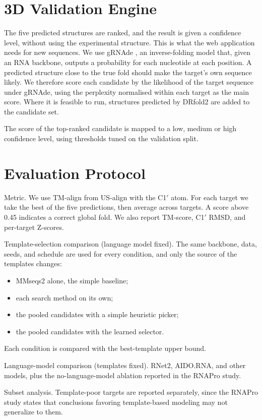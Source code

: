 \documentclass{FastFyp}
\begin{document}
\section{3D Validation Engine}
The five predicted structures are ranked, and the result is given a confidence level, without using the experimental structure. This is what the web application needs for new sequences. We use gRNAde \cite{joshi2025grnade}, an inverse-folding model that, given an RNA backbone, outputs a probability for each nucleotide at each position. A predicted structure close to the true fold should make the target's own sequence likely. We therefore score each candidate by the likelihood of the target sequence under gRNAde, using the perplexity normalised within each target as the main score. Where it is feasible to run, structures predicted by DRfold2 \cite{ref:Li:2026} are added to the candidate set.

The score of the top-ranked candidate is mapped to a low, medium or high confidence level, using thresholds tuned on the validation split.

\section{Evaluation Protocol}
Metric. We use TM-align from US-align with the C1$'$ atom. For each target we take the best of the five predictions, then average across targets. A score above 0.45 indicates a correct global fold. We also report TM-score, C1$'$ RMSD, and per-target Z-scores.

Template-selection comparison (language model fixed). The same backbone, data, seeds, and schedule are used for every condition, and only the source of the templates changes:
\begin{itemize}
  \item MMseqs2 alone, the simple baseline;
  \item each search method on its own;
  \item the pooled candidates with a simple heuristic picker;
  \item the pooled candidates with the learned selector.
\end{itemize}
Each condition is compared with the best-template upper bound.

Language-model comparison (templates fixed). RNet2, AIDO.RNA, and other models, plus the no-language-model ablation reported in the RNAPro study.

Subset analysis. Template-poor targets are reported separately, since the RNAPro study states that conclusions favoring template-based modeling may not generalize to them.
\end{document}
